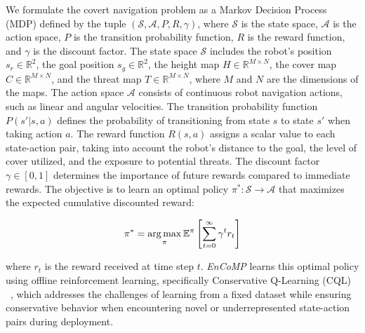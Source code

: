 



We formulate the covert navigation problem as a Markov Decision Process (MDP) defined by the tuple $(\mathcal{S}, \mathcal{A}, P, R, \gamma)$, where $\mathcal{S}$ is the state space, $\mathcal{A}$ is the action space, $P$ is the transition probability function, $R$ is the reward function, and $\gamma$ is the discount factor. The state space $\mathcal{S}$ includes the robot's position $s_r \in \mathbb{R}^2$, the goal position $s_g \in \mathbb{R}^2$, the height map $H \in \mathbb{R}^{M \times N}$, the cover map $C \in \mathbb{R}^{M \times N}$, and the threat map $T \in \mathbb{R}^{M \times N}$, where $M$ and $N$ are the dimensions of the maps. The action space $\mathcal{A}$ consists of continuous robot navigation actions, such as linear and angular velocities. The transition probability function $P(s' | s, a)$ defines the probability of transitioning from state $s$ to state $s'$ when taking action $a$. The reward function $R(s, a)$ assigns a scalar value to each state-action pair, taking into account the robot's distance to the goal, the level of cover utilized, and the exposure to potential threats. The discount factor $\gamma \in [0, 1]$ determines the importance of future rewards compared to immediate rewards.
The objective is to learn an optimal policy $\pi^*: \mathcal{S} \rightarrow \mathcal{A}$ that maximizes the expected cumulative discounted reward:


\begin{equation}
\pi^* = \operatorname*{arg\,max}_{\pi} \mathbb{E}^\pi \left[ \sum_{t=0}^{\infty} \gamma^t r_t \right]
\end{equation}


where $r_t$ is the reward received at time step $t$. \textit{EnCoMP} learns this optimal policy using offline reinforcement learning, specifically Conservative Q-Learning (CQL) ~\cite{kumar2020conservative}, which addresses the challenges of learning from a fixed dataset while ensuring conservative behavior when encountering novel or underrepresented state-action pairs during deployment.

